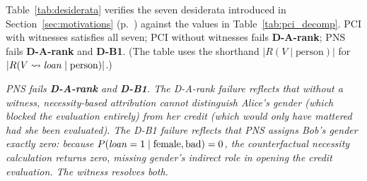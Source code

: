 Table~\ref{tab:desiderata} verifies the seven desiderata introduced in
Section~\ref{sec:motivations} (p.~\pageref{desid}) against the values in Table~\ref{tab:pci_decomp}.
PCI with witnesses satisfies all seven; PCI without witnesses fails \textbf{D-A-rank};
PNS fails \textbf{D-A-rank} and \textbf{D-B1}.
(The table uses the shorthand $|R(V\mid\text{person})|$ for
$|R(V\rightsquigarrow\varname{loan}\mid\text{person})|$.)

\begin{table}[ht]
\centering
{}
\caption{Verification of the seven desiderata (p.~\pageref{desid}) against the values in
Table~\ref{tab:pci_decomp}. PCI with witnesses satisfies all seven; PCI without witnesses
fails \textbf{D-A-rank}; PNS fails \textbf{D-A-rank} and \textbf{D-B1}.}
\label{tab:desiderata}
\end{table}

\medskip\noindent\textit{PNS fails \textbf{D-A-rank} and \textbf{D-B1}. The D-A-rank
failure reflects that without a  witness,
necessity-based attribution cannot distinguish Alice's gender (which blocked the
evaluation entirely) from her credit (which would only have mattered had she been
evaluated). The D-B1 failure reflects that PNS assigns Bob's gender exactly zero:
because $P(\varname{loan}=1\mid\text{female},\text{bad})=0$,
the counterfactual necessity calculation returns zero, missing gender's indirect role in
opening the credit evaluation. The  witness resolves both.}

